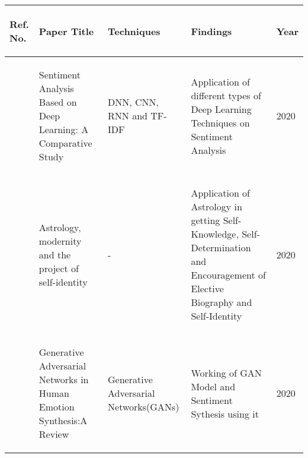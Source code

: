 \begin{tabularx}{\columnwidth}{|X|X|X|X|X|}
	\hline
	\begin{center}\textbf{Ref. No.}\end{center} & \begin{center}\textbf{Paper Title}\end{center} & \begin{center}\textbf{Techniques}\end{center} & \begin{center}\textbf{Findings}\end{center} & \begin{center}\textbf{Year}\end{center}\\
	\hline
	\begin{center}\cite{electronics9030483}\end{center} & \begin{center}Sentiment Analysis Based on Deep Learning: A Comparative Study\end{center} & \begin{center}DNN, CNN, RNN and TF-IDF\end{center} & \begin{center}Application of different types of Deep Learning Techniques on Sentiment Analysis\end{center} & \begin{center}2020\end{center}\\
	\hline
	\begin{center}\cite{doi:10.1080/14755610.2022.2093234}\end{center} & \begin{center}Astrology, modernity and the project of self-identity\end{center} & \begin{center}-\end{center} & \begin{center}Application of Astrology in getting Self-Knowledge, Self-Determination and Encouragement of Elective Biography and Self-Identity\end{center} & \begin{center}2020\end{center}\\
	\hline
	\begin{center}\cite{article0}\end{center} & \begin{center}Generative Adversarial Networks in Human Emotion Synthesis:A Review\end{center} & \begin{center}Generative Adversarial Networks(GANs)\end{center} & \begin{center}Working of GAN Model and Sentiment Sythesis using it\end{center} & \begin{center}2020\end{center}\\
	\hline
\end{tabularx}

